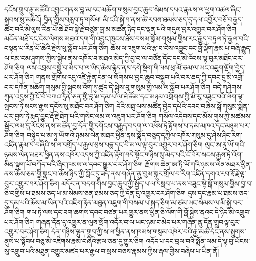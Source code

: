 
\normalsize
{}

\ti
དངོས་གྲུབ་རྒྱ་མཚོའི་འབྱུང་གནས་བླ་མ་དང་མཆོག་གསུམ་བྱང་ཆུབ་སེམས་དཔའ་རྣམས་ལ་ཕྱག་འཚལ་ཞིང་སྐྱབས་སུ་མཆིའོ།
བྱིན་གྱིས་བརླབ་ཏུ་གསོལ།
མི་ངའི་སྐྱེ་བ་ནས་ཚེ་རབས་ཐམས་ཅད་དུ་དལ་འབྱོར་བཅོ་བརྒྱད་ཚང་བའི་མི་ལུས་རིན་པོ་ཆེ་ཐོབ་སྟེ་རྗེ་བཙུན་བླ་མ་མཚན་ཉིད་དང་ལྡན་པའི་གདུལ་བྱར་འགྱུར་བར་ཤོག་ཅིག
མངོན་མཐོ་དང་ངེས་ལེགས་མཐའ་དག་གི་འབྱུང་ཁུངས་ཐོས་བསམ་སྒོམ་གསུམ་གྱིས་རང་རྒྱུད་བཏུལ་ཏེ་རྒྱལ་བའི་བསྟན་པ་རིན་པོ་ཆེའི་རྗེས་སུ་སློབ་པར་ཤོག་ཅིག
ཆོས་ལ་འཇུག་པའི་རྩ་བ་ངེས་འབྱུང་དང་བློ་ལྡོག་རྣམ་པ་བཞི་རྒྱུད་ལ་ངམ་ངམ་ཤུགས་ཀྱིས་སྐྱེས་ནས་འཁོར་བ་མཐའ་མེད་ཀྱི་བྱ་བ་ལ་བཙོན་དོང་དང་མེ་འོབས་ལྟ་བུར་མཐོང་བར་ཤོག་ཅིག
ལས་འབྲས་བསླུ་བ་མེད་པ་ལ་ཡིད་ཆེས་རྙེད་ནས་དགེ་སྡིག་གི་ལས་ཕྲ་མོ་ཙམ་ལ་ཡང་འཇུག་ལྡོག་བྱེད་པར་ཤོག་ཅིག
གནས་གྲོགས་འདུ་འཛི་རྐྱེན་ངན་ལ་སོགས་པ་བྱང་ཆུབ་བསྒྲུབ་པའི་བར་ཆད་ཀྱི་དབང་དུ་མི་འགྲོ་བར་དཀོན་མཆོག་གསུམ་གྱི་སྐྱབས་འོག་ཏུ་ཚུད་དེ་སྐྱེས་བུ་གསུམ་གྱི་ལམ་ལ་སློབ་པར་ཤོག་ཅིག
བདེ་གཤེགས་ཀུན་འདུས་ཀྱི་ངོ་བོ་བཀའ་དྲིན་ཅན་གྱི་བླ་མ་དམ་པ་ལ་ཐེ་ཚོམ་དང་མཉམ་འགྲོགས་ཀྱི་མི་རུ་བཟུང་བའི་ལོག་ལྟ་སྤངས་ཏེ་སངས་རྒྱས་དངོས་སུ་མཐོང་བར་ཤོག་ཅིག
དེའི་མཐུ་ལས་མཚོན་བྱེད་དཔེའི་དབང་བཞིས་སྒོ་གསུམ་སྨིན་པར་བྱས་ཏེ་རྨད་བྱུང་རྡོ་རྗེ་ཐེག་པའི་གསེང་ལམ་ལ་འཇུག་པར་ཤོག་ཅིག
གསོལ་འདེབས་དང་མོས་གུས་ཀྱི་མཚམས་སྦྱོར་ལམ་དུ་ལོངས་ནས་མཚོན་བྱ་དོན་གྱི་དགོངས་བརྒྱུད་བདག་ལ་འཕོས་ཏེ་རྟོགས་པ་ནམ་མཁའ་དང་མཉམ་པར་ཤོག་ཅིག
བསྐྱེད་པ་མ་ཧཱ་ཡོ་གའི་ཉམས་ལེན་མཐར་ཕྱིན་ནས་སྣོད་བཅུད་དཀྱིལ་འཁོར་གསུམ་དུ་ཤེས་ཤིང་རིག་འཛིན་རྣམ་པ་བཞིའི་ས་ལ་བགྲོད་པ་རྒྱལ་སྲས་པདྨ་དང་བི་མ་ལ་ལྟ་བུར་འགྱུར་བར་ཤོག་ཅིག
ལུང་ཨ་ནུ་ཡོ་གའི་ཉམས་ལེན་མཐར་ཕྱིན་ནས་འཁོར་འདས་ཀྱི་འཛིན་རྟོག་བདེ་སྟོང་གཉིས་སུ་མེད་པའི་ངོ་བོར་སངས་རྒྱས་ཏེ་འོག་མིན་སྟུག་པོ་བཀོད་པའི་ཞིང་ཁམས་ལ་དབང་སྒྱུར་བར་ཤོག་ཅིག
རྫོགས་ཆེན་ཨ་ཏི་ཡོ་གའི་ཉམས་ལེན་མཐར་ཕྱིན་ནས་ཆོས་ཅན་གྱི་སྣང་བ་ཆོས་ཉིད་ཀྱི་ཀློང་དུ་ཟད་ནས་གཞོན་ནུ་བུམ་སྐུར་གྲོལ་བ་རིག་འཛིན་དགའ་རབ་རྡོ་རྗེ་ལྟ་བུར་འགྱུར་བར་ཤོག་ཅིག
མདོར་ན་བདག་གིས་བྱང་ཆུབ་ཀྱི་སྤྱོད་པ་ལ་བསླབ་པ་ནས་བཟུང་སྟེ་སྒོ་གསུམ་གྱིས་བྱ་བ་ཅི་བགྱིས་པ་ཐམས་ཅད་ཕ་མ་སེམས་ཅན་ཐམས་ཅད་ཀྱི་དོན་དུ་འགྱུར་བར་ཤོག་ཅིག
དུས་དང་རྣམ་པ་ཐམས་ཅད་དུ་དམ་པའི་ཆོས་མ་ཡིན་པའི་འཇིག་རྟེན་མཐུན་འཇུག་གི་བསམ་པ་སྐད་ཅིག་མ་ཙམ་ཡང་སེམས་ལ་མི་སྐྱེ་བར་ཤོག་ཅིག
གལ་ཏེ་ལས་དང་བག་ཆགས་དབང་བཙན་པར་གྱུར་ནས་ཕྱིན་ཅི་ལོག་གི་བློ་སྐྱེས་ནའང་དེ་ཉིད་མི་འགྲུབ་པར་ཤོག་ཅིག
གཞན་དོན་དུ་འགྱུར་ན་ལུས་སྲོག་འདོར་བ་ལ་ཡང་ཉམ་ང་མེད་པར་གཞོན་ནུ་དོན་གྲུབ་ལྟ་བུར་འགྱུར་བར་ཤོག་ཅིག
དོན་གཉིས་ལྷུན་གྲུབ་ཀྱི་ས་ལ་ཕྱིན་ནས་ཁམས་གསུམ་འཁོར་བའི་རྒྱ་མཚོ་དོང་ནས་སྤྲུགས་ནུས་པ་སྟོབས་བཅུ་མི་འཇིགས་རྣམ་བཞིའི་རྩལ་ཅན་དུ་གྱུར་ཅིག
འདོད་པ་དང་བྲལ་བའི་སྨོན་ལམ་དེ་ལྟ་བུ་ཡོངས་སུ་འགྲུབ་པའི་མཐུན་འགྱུར་མཛད་པར་རྒྱལ་བ་སྲས་བཅས་རྣམས་ཀྱིས་ཞལ་གྱིས་བཞེས་པ་ཡིན་ནོ།
